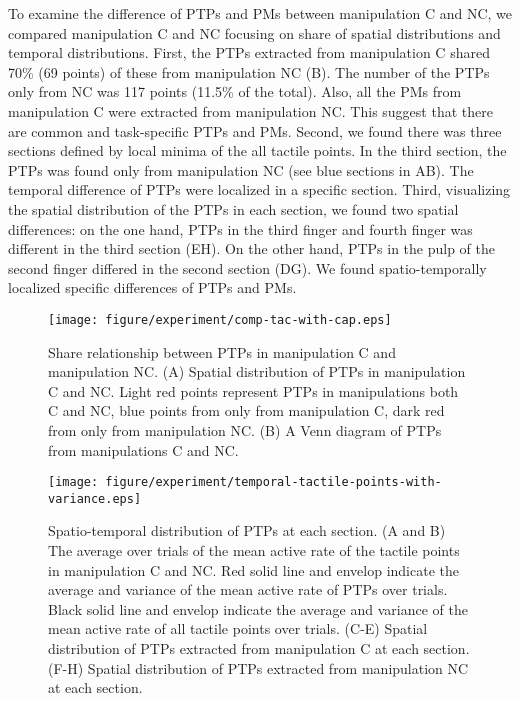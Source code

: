 \documentclass[letterpaper, 10 pt, conference]{IEEEtran}  %
\begin{document}
To examine the difference of PTPs and PMs between manipulation C and NC, we compared manipulation C and NC focusing on share of spatial distributions and temporal distributions. First, the PTPs extracted from manipulation C shared 70\% (69 points) of these from manipulation NC (B). The number of the PTPs only from NC was 117 points (11.5\% of the total). Also, all the PMs from manipulation C were extracted from manipulation NC. This suggest that there are common and task-specific PTPs and PMs. Second, we found there was three sections defined by local minima of the all tactile points. In the third section, the PTPs was found only from manipulation NC (see blue sections in AB). The temporal difference of PTPs were localized in a specific section. Third, visualizing the spatial distribution of the PTPs in each section, we found two spatial differences: on the one hand, PTPs in the third finger and fourth finger was different in the third section (EH). On the other hand, PTPs in the pulp of the second finger differed in the second section (DG). We found spatio-temporally localized specific differences of PTPs and PMs.

\begin{figure}[!t]
 \centering
  \texttt{[image: figure/experiment/comp-tac-with-cap.eps]}
  \caption{Share relationship between PTPs in manipulation C and manipulation NC. (A) Spatial distribution of PTPs in manipulation C and NC. Light red points represent PTPs in manipulations both C and NC, blue points from only from manipulation C, dark red from only from manipulation NC. (B) A Venn diagram of PTPs from manipulations C and NC.}
 \label{fig:comp-tac}
\end{figure}



\begin{figure*}[t!]
 \centering
  \texttt{[image: figure/experiment/temporal-tactile-points-with-variance.eps]}
  \caption{Spatio-temporal distribution of PTPs at each section. (A and B) The average over trials of the mean active rate of the tactile points in manipulation C and NC. Red solid line and envelop indicate the average and variance of the mean active rate of PTPs over trials. Black solid line and envelop indicate the average and variance of the mean active rate of all tactile points over trials. (C-E) Spatial distribution of PTPs extracted from manipulation C at each section. (F-H) Spatial distribution of PTPs extracted from manipulation NC at each section.}
 \label{fig:temporal-tactile-points-with-variance}
\end{figure*}
\end{document}
